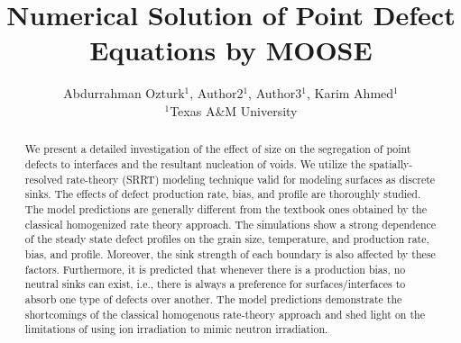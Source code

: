 \documentclass[a4paper]{article}
\title{Numerical Solution of Point Defect Equations by MOOSE}
\author{Abdurrahman Ozturk$^{1}$, Author2$^{1}$, Author3$^{1}$, Karim Ahmed$^{1}$  \\
        \small $^{1}$Texas A\&M University \\
}
\begin{document}
\maketitle

\begin{abstract}

We present a detailed investigation of the effect of size on the segregation of point defects to interfaces and the resultant nucleation of voids. We utilize the spatially-resolved rate-theory (SRRT) modeling technique valid for modeling surfaces as discrete sinks. The effects of defect production rate, bias, and profile are thoroughly studied. The model predictions are generally different from the textbook ones obtained by the classical homogenized rate theory approach. The simulations show a strong dependence of the steady state defect profiles on the grain size, temperature, and production rate, bias, and profile. Moreover, the sink strength of each boundary is also affected by these factors. Furthermore, it is predicted that whenever there is a production bias, no neutral sinks can exist, i.e., there is always a preference for surfaces/interfaces to absorb one type of defects over another. The model predictions demonstrate the shortcomings of the classical homogenous rate-theory approach and shed light on the limitations of using ion irradiation to mimic neutron irradiation.


\end{abstract} \hspace{10pt}
\end{document}
